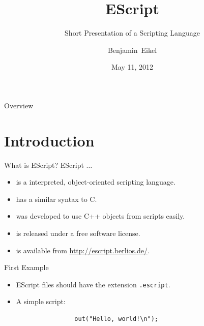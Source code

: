 \documentclass[ucs,9pt]{beamer}
\title{EScript}
\subtitle{Short Presentation of a Scripting Language}
\author{Benjamin~Eikel}
\date{May 11, 2012}
\begin{document}
\maketitle

\begin{frame}{Overview}
\tableofcontents
\end{frame}

\section{Introduction}
\begin{frame}{What is EScript?}
EScript $\ldots$ \\[1em]
\begin{itemize}
	\addtolength{\itemsep}{\baselineskip}
	\item is a interpreted, object-oriented scripting language.
	\item has a similar syntax to C.
	\item was developed to use C++ objects from scripts easily.
	\item is released under a free software license.
	\item is available from \url{http://escript.berlios.de/}.
\end{itemize}
\end{frame}

\begin{frame}[fragile]{First Example}
\begin{itemize}
	\addtolength{\itemsep}{\baselineskip}
	\item EScript files should have the extension \texttt{.escript}.
	\item A simple script:
			\begin{lstlisting}
				out("Hello, world!\n");
			\end{lstlisting}
\end{itemize}
\end{frame}
\end{document}
